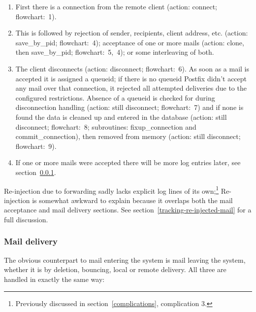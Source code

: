 \documentclass[a4paper,12pt,draft]{article}
\begin{document}
\begin{enumerate}
        
    \item First there is a connection from the remote client
        (action: connect; flowchart:~1).

    \item This is followed by rejection of sender, recipients, client
        address, etc. (action: save\_by\_pid; flowchart:~4); acceptance of
        one or more mails (action: clone, then save\_by\_pid;
        flowchart:~5,~4); or some interleaving of both.
        
    \item The client disconnects (action: disconnect; flowchart:~6).  As
        soon as a mail is accepted it is assigned a queueid; if there is no
        queueid Postfix didn't accept any mail over that connection, it
        rejected all attempted deliveries due to the configured
        restrictions.  Absence of a queueid is checked for during
        disconnection handling (action: still disconnect; flowchart:~7) and
        if none is found the data is cleaned up and entered in the database
        (action: still disconnect; flowchart:~8; subroutines:
        fixup\_connection and commit\_connection), then removed from memory
        (action: still disconnect; flowchart:~9).

    \item If one or more mails were accepted there will be more log entries
        later, see section~\ref{mail-delivery}.

\end{enumerate}

Re-injection due to forwarding sadly lacks explicit log lines of its
own;\footnote{Previously discussed in section~\ref{complications},
complication 3.}  Re-injection is somewhat awkward to explain because it
overlaps both the mail acceptance and mail delivery sections.  See
section~\ref{tracking-re-injected-mail} for a full discussion.

\subsubsection{Mail delivery}

\label{mail-delivery}

The obvious counterpart to mail entering the system is mail leaving the
system, whether it is by deletion, bouncing, local or remote delivery.  All
three are handled in exactly the same way:
\end{document}

